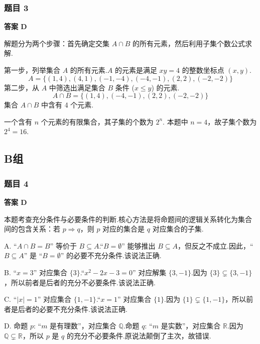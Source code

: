 \subsubsection*{题目 3}
\begin{solution}
	\textbf{答案 D}
	
	解题分为两个步骤：首先确定交集 $A \cap B$ 的所有元素，然后利用子集个数公式求解.
	
	第一步，列举集合 $A$ 的所有元素.$A$ 的元素是满足 $xy=4$ 的整数坐标点 $(x,y)$.
	\[ A = \{(1,4), (4,1), (-1,-4), (-4,-1), (2,2), (-2,-2)\} \]
	第二步，从 $A$ 中筛选出满足集合 $B$ 条件 ($x \le y$) 的元素.
	\[ A \cap B = \{(1,4), (-4,-1), (2,2), (-2,-2)\} \]
	集合 $A \cap B$ 中含有 4 个元素.
	
	一个含有 $n$ 个元素的有限集合，其子集的个数为 $2^n$.
	本题中 $n=4$，故子集个数为 $2^4 = 16$.
\end{solution}

\subsection*{B组}

\subsubsection*{题目 4}
\begin{solution}
	\textbf{答案 D}
	
	本题考查充分条件与必要条件的判断.核心方法是将命题间的逻辑关系转化为集合间的包含关系：若 $p \Rightarrow q$，则 $p$ 对应的集合是 $q$ 对应集合的子集.
	
	A. “$A \cap B = B$” 等价于 $B \subseteq A$.“$B=\emptyset$” 能够推出 $B \subseteq A$，但反之不成立.因此，“$B \subseteq A$” 是 “$B=\emptyset$” 的必要不充分条件.该说法正确.
	
	B. “$x=3$” 对应集合 $\{3\}$.“$x^2-2x-3=0$” 对应解集 $\{3, -1\}$.因为 $\{3\} \subsetneq \{3, -1\}$，所以前者是后者的充分不必要条件.该说法正确.
	
	C. “$|x|=1$” 对应集合 $\{1, -1\}$.“$x=1$” 对应集合 $\{1\}$.因为 $\{1\} \subsetneq \{1, -1\}$，所以前者是后者的必要不充分条件.该说法正确.
	
	D. 命题 $p$: “$m$ 是有理数”，对应集合 $\mathbb{Q}$.命题 $q$: “$m$ 是实数”，对应集合 $\mathbb{R}$.因为 $\mathbb{Q} \subsetneq \mathbb{R}$，所以 $p$ 是 $q$ 的充分不必要条件.原说法颠倒了主次，故错误.
\end{solution}


